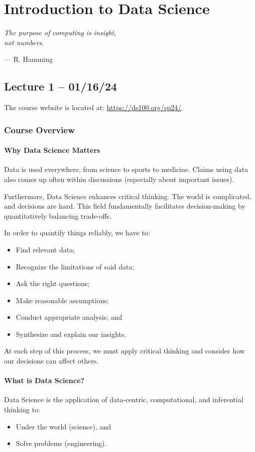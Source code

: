 \documentclass[openany]{book}
\begin{document}
\chapter{Introduction to Data Science}
\epigraph{\textit{The purpose of computing is insight,\\not numbers.}}{--- R. Hamming}

\section{Lecture 1 -- 01/16/24}
The course website is located at: \url{https://ds100.org/sp24/}.

\subsection{Course Overview}

\subsubsection{Why Data Science Matters}
Data is used everywhere, from science to sports to medicine. Claims using data also comes up often within discussions (especially about important issues).

Furthermore, Data Science enhances critical thinking. The world is complicated, and decisions are hard. This field fundamentally facilitates decision-making by quantitatively balancing trade-offs.

In order to quantify things reliably, we have to:
\begin{itemize}
	\item Find relevant data;
	\item Recognize the limitations of said data;
	\item Ask the right questions;
	\item Make reasonable assumptions;
	\item Conduct appropriate analysis; and
	\item Synthesize and explain our insights.
\end{itemize}

At each step of this process, we must apply critical thinking and consider how our decisions can affect others.

\newpage

\subsubsection{What is Data Science?}
\begin{defn}\label{def: data science}
	Data Science is the application of data-centric, computational, and inferential thinking to:
	\begin{itemize}
		\item Under the world (science), and
		\item Solve problems (engineering).
	\end{itemize}
\end{defn}
\end{document}
